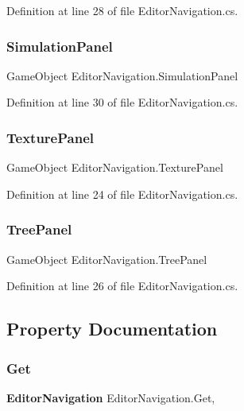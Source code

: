 Definition at line 28 of file Editor\+Navigation.\+cs.

\mbox{\label{class_editor_navigation_a4c2e7df67c97280479d5b8ccce0e9f0a}} 
\subsubsection{Simulation\+Panel}
{\footnotesize\ttfamily Game\+Object Editor\+Navigation.\+Simulation\+Panel}



Definition at line 30 of file Editor\+Navigation.\+cs.

\mbox{\label{class_editor_navigation_ab7f7bc8ee4745b6006be8d37ed619d2b}} 
\subsubsection{Texture\+Panel}
{\footnotesize\ttfamily Game\+Object Editor\+Navigation.\+Texture\+Panel}



Definition at line 24 of file Editor\+Navigation.\+cs.

\mbox{\label{class_editor_navigation_ac1ed91ea67300eeda306ba043d7f8025}} 
\subsubsection{Tree\+Panel}
{\footnotesize\ttfamily Game\+Object Editor\+Navigation.\+Tree\+Panel}



Definition at line 26 of file Editor\+Navigation.\+cs.



\subsection{Property Documentation}
\mbox{\label{class_editor_navigation_a9250c3737c720d40eb4569f5f21c31cd}} 
\subsubsection{Get}
{\footnotesize\ttfamily \textbf{ Editor\+Navigation} Editor\+Navigation.\+Get\hspace{0.3cm}{\ttfamily [static]}, {\ttfamily [get]}}



